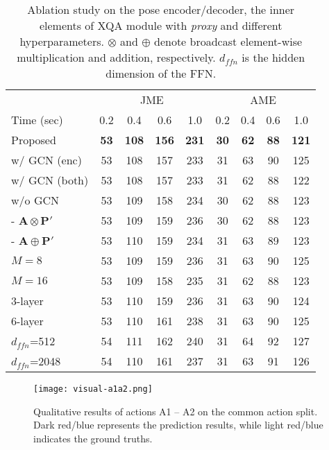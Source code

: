 \documentclass[10pt,twocolumn,letterpaper]{article}
\begin{document}
\begin{table}[ht]
    \setlength\tabcolsep{4.0pt}
    \caption{Ablation study on the pose encoder/decoder, the inner elements of XQA module with \textit{proxy} and different hyperparameters. 
$\otimes$ and $\oplus$ denote broadcast element-wise multiplication and addition, respectively. 
    $d_{ffn}$ is the hidden dimension of the FFN.  }
\label{tab:ablation2}
    \begin{center}
\small
    \begin{tabular}{l|cccc|cccc}
\hline
        & \multicolumn{4}{c|}{JME} & \multicolumn{4}{c}{AME} \\
        \cline{2-9}
        Time (sec) & 0.2 & 0.4 & 0.6 & 1.0 & 0.2 & 0.4 & 0.6 & 1.0 \\
        \hline
        Proposed & \textbf{53} & \textbf{108} & \textbf{156} & \textbf{231} & \textbf{30} & \textbf{62} & \textbf{88} & \textbf{121}  \\
        \hline
        w/ GCN (enc) & 53 & 108 & 157 & 233 & 31 & 63 & 90 &  125  \\
        w/ GCN (both) & 53 & 108 & 157 & 233 & 31 & 62 & 88 & 122  \\
        w/o GCN &  53 & 109 & 158 & 234 & 30 & 62 & 88 & 123  \\
        \hline
        - $\bm{A} \otimes \bm{P}'$ & 53 & 109 & 159 & 236 & 30 & 62 & 88 & 123  \\
        - $\bm{A} \oplus \bm{P}'$ & 53 & 110 & 159 & 234 & 31 & 63 & 89 & 123  \\
        \hline
        $M = 8$ & 53 & 109 & 159 & 236 & 31 & 63 & 90 & 125 \\
        $M = 16$ & 53 & 109 & 158 & 235 & 31 & 62 & 88 & 123 \\
        3-layer & 53 & 110 & 159 & 236 & 31 & 63 & 90 & 124  \\
        6-layer & 53 & 110 & 161 & 238 & 31 & 63 & 90 & 125  \\
$d_{ffn}$=512 & 54 & 111 & 162 & 240 & 31 & 64 & 92 & 127 \\
        $d_{ffn}$=2048 & 54 & 110 & 161 & 237 & 31 & 63 & 91 & 126 \\
        \hline
    \end{tabular}
    \end{center}
\end{table}

\begin{figure*}[ht]
	\begin{center}
		\centerline{\texttt{[image: visual-a1a2.png]}} \caption{Qualitative results of actions A1 -- A2 on the common action split. Dark red/blue represents the prediction results, while light red/blue indicates the ground truths. }
		\label{fig:visual_a1a2}
	\end{center}
\end{figure*}
\end{document}
